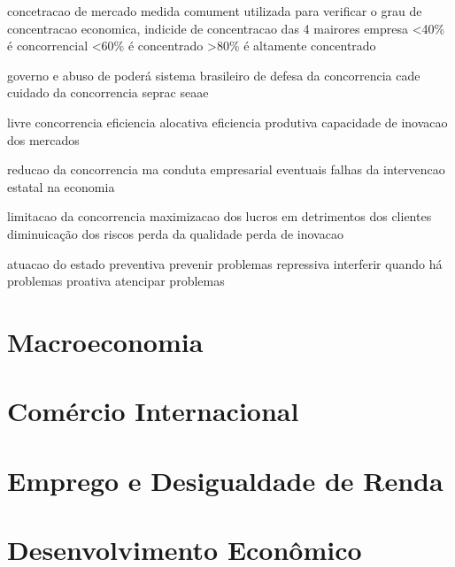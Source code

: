 \documentclass{article}
\begin{document}
            concetracao de mercado
                medida comument utilizada para verificar o grau de concentracao economica, indicide de concentracao das 4 mairores empresa 
                    <40\% é concorrencial
                    <60\% é concentrado
                    >80\% é altamente concentrado

            governo e abuso de poderá
                sistema brasileiro de defesa da concorrencia
                    cade
                        cuidado da concorrencia
                    seprac
                    seaae

            livre concorrencia
                eficiencia alocativa
                eficiencia produtiva
                capacidade de inovacao dos mercados

            reducao da concorrencia
                ma conduta empresarial
                eventuais falhas da intervencao estatal na economia

            limitacao da concorrencia
                maximizacao dos lucros
                    em detrimentos dos clientes
                diminuicação dos riscos
                    perda da qualidade
                    perda de inovacao
                
            atuacao do estado
                preventiva
                    prevenir problemas
                repressiva
                    interferir quando há problemas
                proativa
                    atencipar problemas

    \section{Macroeconomia}

    \section{Comércio Internacional}

    \section{Emprego e Desigualdade de Renda}

    \section{Desenvolvimento Econômico}
\end{document}
